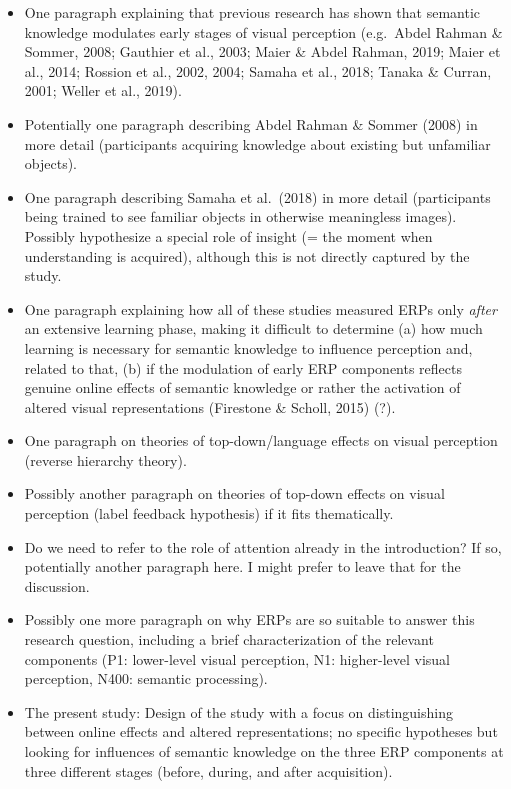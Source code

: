 \documentclass[
  english,
  man,11pt,floatsintext]{apa7}
\begin{document}
\begin{itemize}
\item
  One paragraph explaining that previous research has shown that semantic knowledge modulates early stages of visual perception (e.g.~Abdel Rahman \& Sommer, 2008; Gauthier et al., 2003; Maier \& Abdel Rahman, 2019; Maier et al., 2014; Rossion et al., 2002, 2004; Samaha et al., 2018; Tanaka \& Curran, 2001; Weller et al., 2019).
\item
  Potentially one paragraph describing Abdel Rahman \& Sommer (2008) in more detail (participants acquiring knowledge about existing but unfamiliar objects).
\item
  One paragraph describing Samaha et al.~(2018) in more detail (participants being trained to see familiar objects in otherwise meaningless images). Possibly hypothesize a special role of insight (= the moment when understanding is acquired), although this is not directly captured by the study.
\item
  One paragraph explaining how all of these studies measured ERPs only \emph{after} an extensive learning phase, making it difficult to determine (a) how much learning is necessary for semantic knowledge to influence perception and, related to that, (b) if the modulation of early ERP components reflects genuine online effects of semantic knowledge or rather the activation of altered visual representations (Firestone \& Scholl, 2015) (?).
\item
  One paragraph on theories of top-down/language effects on visual perception (reverse hierarchy theory).
\item
  Possibly another paragraph on theories of top-down effects on visual perception (label feedback hypothesis) if it fits thematically.
\item
  Do we need to refer to the role of attention already in the introduction? If so, potentially another paragraph here. I might prefer to leave that for the discussion.
\item
  Possibly one more paragraph on why ERPs are so suitable to answer this research question, including a brief characterization of the relevant components (P1: lower-level visual perception, N1: higher-level visual perception, N400: semantic processing).
\item
  The present study: Design of the study with a focus on distinguishing between online effects and altered representations; no specific hypotheses but looking for influences of semantic knowledge on the three ERP components at three different stages (before, during, and after acquisition).
\end{itemize}
\end{document}
